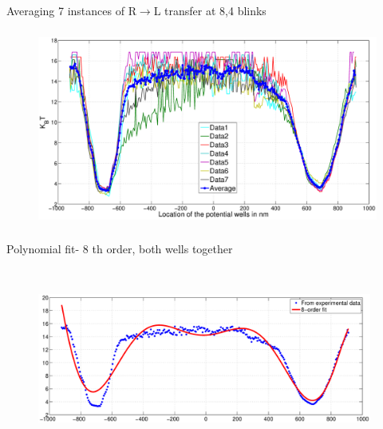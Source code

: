 \documentclass{beamer}
\begin{document}
\begin{frame}{Averaging 7 instances of R$\rightarrow$L transfer at 8,4 blinks} 

\begin{figure}
    \centering
    \includegraphics[height=6.5cm,width=12cm]{Mean_of_the_seven_potential_wells_probb1.eps}
    \label{fig:graph27}
\end{figure}

\end{frame}
\begin{frame}{Polynomial fit- 8 th order, both wells together} 

\begin{figure}
    \centering
    \includegraphics[height=6cm,width=11cm]{total_polyfit_probb1_8order.eps}
    \label{fig:graph28}
\end{figure}

\end{frame}
\end{document}
